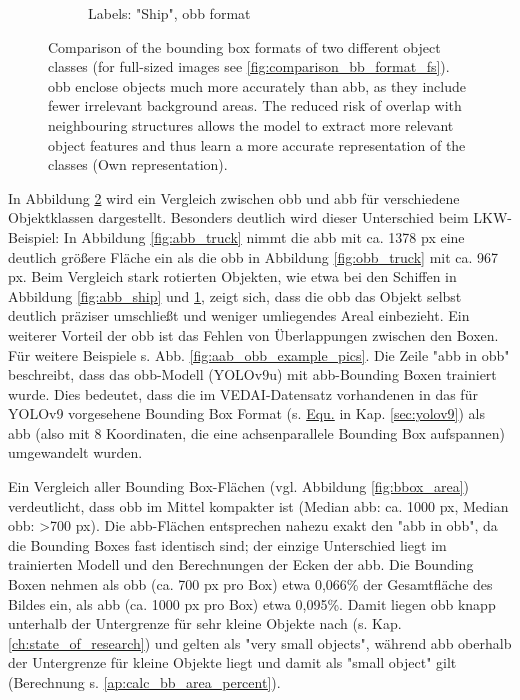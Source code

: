 \begin{figure}[h]
\begin{subfigure}[b]{0.45\textwidth}
        \caption{Labels: "Ship", obb format}
        \label{fig:obb_ship}
    \end{subfigure}  
    \caption[Comparison of the bounding box formats of two different object classes]{Comparison of the bounding box formats of two different object classes (for full-sized images see \ref{fig:comparison_bb_format_fs}). \acrshort{obb} enclose objects much more accurately than \acrshort{abb}, as they include fewer irrelevant background areas. The reduced risk of overlap with neighbouring structures allows the model to extract more relevant object features and thus learn a more accurate representation of the classes (Own representation).
}
    \label{fig:comparison_bb_format}
\end{figure}


In Abbildung \ref{fig:comparison_bb_format} wird ein Vergleich zwischen \acrshort{obb} und \acrshort{abb} für verschiedene Objektklassen dargestellt. Besonders deutlich wird dieser Unterschied beim LKW-Beispiel: In Abbildung \ref{fig:abb_truck} nimmt die \acrshort{abb} mit ca. 1378 px eine deutlich größere Fläche ein als die \acrshort{obb} in Abbildung \ref{fig:obb_truck} mit ca. 967 px. Beim Vergleich stark rotierten Objekten, wie etwa bei den Schiffen in Abbildung \ref{fig:abb_ship} und \ref{fig:obb_ship}, zeigt sich, dass die \acrshort{obb} das Objekt selbst deutlich präziser umschließt und weniger umliegendes Areal einbezieht. Ein weiterer Vorteil der \acrshort{obb} ist das Fehlen von Überlappungen zwischen den Boxen. Für weitere Beispiele s. Abb. \ref{fig:aab_obb_example_pics}. Die Zeile "abb in obb" beschreibt, dass das \acrshort{obb}-Modell (\acrshort{YOLO}v9u) mit \acrshort{abb}-Bounding Boxen trainiert wurde. Dies bedeutet, dass die im \acrshort{VEDAI}-Datensatz vorhandenen  in das für \acrshort{YOLO}v9 vorgesehene Bounding Box Format (s. \hyperlink{eq:yolov9u}{Equ.} in Kap. \ref{sec:yolov9}) als \acrshort{abb} (also mit 8 Koordinaten, die eine achsenparallele Bounding Box aufspannen) umgewandelt wurden. 

Ein Vergleich aller Bounding Box-Flächen (vgl. Abbildung \ref{fig:bbox_area}) verdeutlicht, dass \acrshort{obb} im Mittel kompakter ist (Median \acrshort{abb}: ca. 1000 px, Median \acrshort{obb}: >700 px). Die \acrshort{abb}-Flächen entsprechen nahezu exakt den "abb in obb", da die Bounding Boxes fast identisch sind; der einzige Unterschied liegt im trainierten Modell und den Berechnungen der Ecken der \acrshort{abb}. Die Bounding Boxen nehmen  als \acrshort{obb} (ca. 700 px pro Box) etwa 0,066\% der Gesamtfläche des Bildes ein, als \acrshort{abb} (ca. 1000 px pro Box) etwa 0,095\%. Damit liegen \acrshort{obb} knapp unterhalb der Untergrenze für sehr kleine Objekte nach \citeauthor{Chen2017} \cite{Chen2017} (s. Kap. \ref{ch:state_of_research}) und gelten als "very small objects", während \acrshort{abb} oberhalb der Untergrenze für kleine Objekte liegt und damit als "small object" gilt (Berechnung s. \ref{ap:calc_bb_area_percent}).


